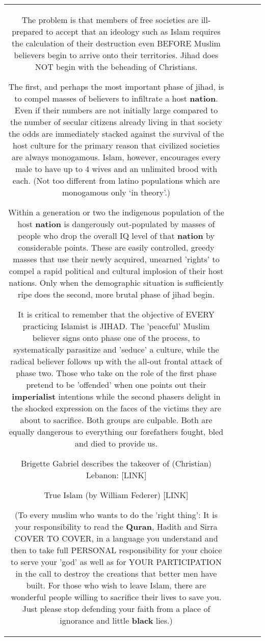 \documentclass[11pt]{article}
\newlength\mylength
\begin{document}
\begin{center}
\begin{longtable}{|C{.65\mylength}|C{.30\mylength}|C{.12\mylength}|C{.12\mylength}|C{.12\mylength}|}
  \small The problem is that members of free societies are ill-prepared to accept that an ideology such as Islam requires the calculation of their destruction even BEFORE Muslim believers begin to arrive onto their territories. Jihad does NOT begin with the beheading of Christians. 

The first, and perhaps the most important phase of jihad, is to compel masses of believers to infiltrate a host \textbf{nation}. Even if their numbers are not initially large compared to the number of secular citizens already living in that society the odds are immediately stacked against the survival of the host culture for the primary reason that civilized societies are always monogamous. Islam, however, encourages every male to have up to 4 wives and an unlimited brood with each. (Not too different from latino populations which are monogamous only ‘in theory'.) 

Within a generation or two the indigenous population of the host \textbf{nation} is dangerously out-populated by masses of people who drop the overall IQ level of that \textbf{nation} by considerable points. These are easily controlled, greedy masses that use their newly acquired, unearned 'rights' to compel a rapid political and cultural implosion of their host nations. Only when the demographic situation is sufficiently ripe does the second, more brutal phase of jihad begin. 

It is critical to remember that the objective of EVERY practicing Islamist is JIHAD. The 'peaceful' Muslim believer signs onto phase one of the process, to systematically parasitize and 'seduce' a culture, while the radical believer follows up with the all-out frontal attack of phase two. Those who take on the role of the first phase pretend to be 'offended' when one points out their \textbf{imperialist} intentions while the second phasers delight in the shocked expression on the faces of the victims they are about to sacrifice. Both groups are culpable. Both are equally dangerous to everything our forefathers fought, bled and died to provide us. 

Brigette Gabriel describes the takeover of (Christian) Lebanon:  [LINK]  

True Islam (by William Federer)
 [LINK] 

(To every muslim who wants to do the 'right thing': It is your responsibility to read the \textbf{Quran}, Hadith and Sirra COVER TO COVER, in a language you understand and then to take full PERSONAL responsibility for your choice to serve your 'god' as well as for YOUR PARTICIPATION in the call to destroy the creations that better men have built. For those who wish to leave Islam, there are wonderful people willing to sacrifice their lives to save you. Just please stop defending your faith from a place of ignorance and little \textbf{black} lies.) 


\end{longtable}
\end{center}
\end{document}

